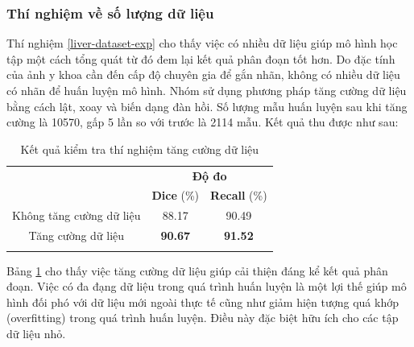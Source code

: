 \subsubsection{Thí nghiệm về số lượng dữ liệu}
Thí nghiệm \ref{liver-dataset-exp} cho thấy việc có nhiều dữ liệu giúp mô hình học tập một cách tổng quát từ đó đem lại kết quả phân đoạn tốt hơn. Do đặc tính của ảnh y khoa cần đến cấp độ chuyên gia để gắn nhãn, không có nhiều dữ liệu có nhãn để huấn luyện mô hình. Nhóm sử dụng phương pháp tăng cường dữ liệu bằng cách lật, xoay và biến dạng đàn hồi. Số lượng mẫu huấn luyện sau khi tăng cường là 10570, gấp 5 lần so với trước là 2114 mẫu. Kết quả thu được như sau:

\begin{table}[H]
\renewcommand{\arraystretch}{1.2}
\centering
\begin{tabular}{c|c|c}
\Xhline{3\arrayrulewidth}
\multirow{2}{*}{\textbf{Thí nghiệm}} & \multicolumn{2}{c}{\textbf{Độ đo}}        \\ \cline{2-3} 
                                     & \textbf{Dice} (\%) & \textbf{Recall} (\%) \\ \hline
Không tăng cường dữ liệu             & 88.17              & 90.49                \\ \hline
Tăng cường dữ liệu                   & \textbf{90.67}     & \textbf{91.52}       \\
\Xhline{3\arrayrulewidth}
\end{tabular}
\caption{Kết quả kiểm tra thí nghiệm tăng cường dữ liệu}
\label{tab:data-augmentation}
\end{table}
\vspace{-5mm}

Bảng \ref{tab:data-augmentation} cho thấy việc tăng cường dữ liệu giúp cải thiện đáng kể kết quả phân đoạn. Việc có đa đạng dữ liệu trong quá trình huấn luyện là một lợi thế giúp mô hình đối phó với dữ liệu mới ngoài thực tế cũng như giảm hiện tượng quá khớp (overfitting) trong quá trình huấn luyện. Điều này đặc biệt hữu ích cho các tập dữ liệu nhỏ.

